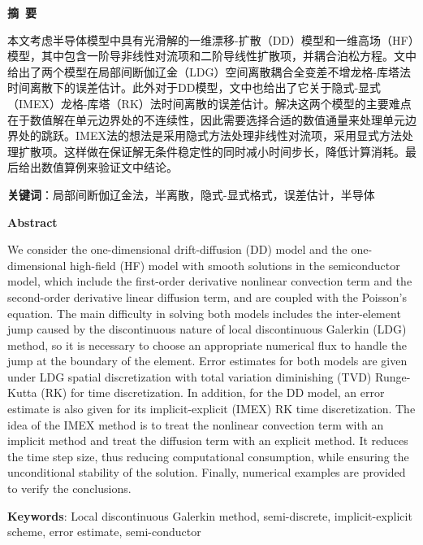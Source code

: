 \cleardoublepage{}
\begin{center}
    \bfseries {} 摘~要
\end{center}
本文考虑半导体模型中具有光滑解的一维漂移-扩散（DD）模型和一维高场（HF）模型，其中包含一阶导非线性对流项和二阶导线性扩散项，并耦合泊松方程。文中给出了两个模型在局部间断伽辽金（LDG）空间离散耦合全变差不增龙格-库塔法时间离散下的误差估计。此外对于DD模型，文中也给出了它关于隐式-显式（IMEX）龙格-库塔（RK）法时间离散的误差估计。解决这两个模型的主要难点在于数值解在单元边界处的不连续性，因此需要选择合适的数值通量来处理单元边界处的跳跃。IMEX法的想法是采用隐式方法处理非线性对流项，采用显式方法处理扩散项。这样做在保证解无条件稳定性的同时减小时间步长，降低计算消耗。最后给出数值算例来验证文中结论。

\noindent \textbf{关键词}：局部间断伽辽金法，半离散，隐式-显式格式，误差估计，半导体
\cleardoublepage{}
\begin{center}
    \bfseries {} Abstract
\end{center}
We consider the one-dimensional drift-diffusion (DD) model and the one-dimensional high-field (HF) model with smooth solutions in the semiconductor model, which include the first-order derivative nonlinear convection term and the second-order derivative linear diffusion term, and are coupled with the Poisson's equation. The main difficulty in solving both models includes the inter-element jump caused by the discontinuous nature of local discontinuous Galerkin (LDG) method, so it is necessary to choose an appropriate numerical flux to handle the jump at the boundary of the element. Error estimates for both models are given under LDG spatial discretization with total variation diminishing (TVD) Runge-Kutta (RK) for time discretization. In addition, for the DD model, an error estimate is also given for its implicit-explicit (IMEX) RK time discretization. The idea of the IMEX method is to treat the nonlinear convection term with an implicit method and treat the diffusion term with an explicit method. It reduces the time step size, thus reducing computational consumption, while ensuring the unconditional stability of the solution. Finally, numerical examples are provided to verify the conclusions.

\noindent \textbf{Keywords}: Local discontinuous Galerkin method, semi-discrete, implicit-explicit scheme, error estimate, semi-conductor